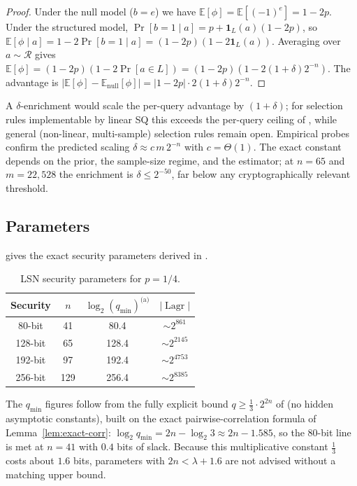 \documentclass[11pt,a4paper]{article}
\theoremstyle{plain}
\theoremstyle{definition}
\newcommand{\E}{\mathbb{E}}
\DeclareMathOperator{\Lagr}{Lagr}
\begin{document}
\begin{proof}
Under the null model ($b=e$) we have $\E[\phi] = \E[(-1)^e] = 1-2p$. Under the structured model, $\Pr[b=1 \mid a] = p + \mathbf{1}_L(a)(1-2p)$, so $\E[\phi \mid a] = 1-2\Pr[b=1 \mid a] = (1-2p)(1-2\mathbf{1}_L(a))$. Averaging over $a \sim \mathcal{R}$ gives $\E[\phi] = (1-2p)(1-2\Pr[a \in L]) = (1-2p)(1-2(1+\delta)2^{-n})$. The advantage is $|\E[\phi]-\E_{\text{null}}[\phi]| = |1-2p| \cdot 2(1+\delta)2^{-n}$.
\end{proof}

A $\delta$-enrichment would scale the per-query advantage by $(1+\delta)$; for selection rules implementable by linear SQ this exceeds the per-query ceiling of , while general (non-linear, multi-sample) selection rules remain open.  Empirical probes confirm the predicted scaling $\delta \approx c\,m\,2^{-n}$ with $c=\Theta(1)$.  The exact constant depends on the prior, the sample-size regime, and the estimator; at $n=65$ and $m=22{,}528$ the enrichment is $\delta \le 2^{-50}$, far below any cryptographically relevant threshold.

\subsection{Parameters}
\label{subsec:parameters}

 gives the exact security parameters derived in .

\begin{table}[ht]
\centering
\caption{LSN security parameters for $p=1/4$.}
\label{tab:parameters}
\begin{tabular}{@{}cccc@{}}
\hline
Security & $n$ & $\log_2(q_{\min})^{\text{(a)}}$ & $|\Lagr|$ \\
\hline
80-bit  & 41  & 80.4  & $\sim 2^{861}$  \\
128-bit & 65  & 128.4 & $\sim 2^{2145}$ \\
192-bit & 97  & 192.4 & $\sim 2^{4753}$ \\
256-bit & 129 & 256.4 & $\sim 2^{8385}$ \\
\hline
\end{tabular}
\vspace{4pt}
\end{table}

The $q_{\min}$ figures follow from the fully explicit bound $q \ge \tfrac13 \cdot 2^{2n}$ of  (no hidden asymptotic constants), built on the exact pairwise-correlation formula of Lemma~\ref{lem:exact-corr}: $\log_2 q_{\min} = 2n - \log_2 3 \approx 2n - 1.585$, so the $80$-bit line is met at $n=41$ with $0.4$ bits of slack. Because this multiplicative constant $\tfrac13$ costs about $1.6$ bits, parameters with $2n < \lambda + 1.6$ are not advised without a matching upper bound.
\end{document}
